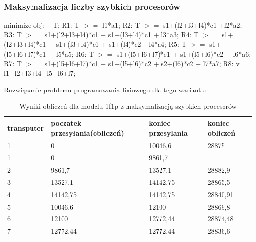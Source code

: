 \documentclass[a4paper,11pt, titlepage]{article}
\begin{document}
\subsubsection{Maksymalizacja liczby szybkich procesorów}
\begin{flushleft}
minimize obj: +T;\linebreak
\linebreak
R1: T $>=$ l1*a1;\linebreak
R2: T $>=$ s1+(l2+l3+l4)*c1 +l2*a2;\linebreak
R3: T $>=$ s1+(l2+l3+l4)*c1 + s1+(l3+l4)*c1 + l3*a3;\linebreak
R4: T $>=$ s1+(l2+l3+l4)*c1 + s1+(l3+l4)*c1 + s1+(l4)*c2 +l4*a4;\linebreak
R5: T $>=$ s1+(l5+l6+l7)*c1 + l5*a5;\linebreak
R6: T $>=$ s1+(l5+l6+l7)*c1 + s1+(l5+l6)*c2 + l6*a6;\linebreak
R7: T $>=$ s1+(l5+l6+l7)*c1 + s1+(l5+l6)*c2 +  s2+(l6)*c2 + l7*a7;\linebreak
R8: v = l1+l2+l3+l4+l5+l6+l7;\linebreak
\end{flushleft}

Rozwiązanie problemu programowania liniowego dla tego wariantu:
\begin{table}[hp!]
\begin{tabular}{|l|l|l|l|}\hline
transputer & poczatek przesyłania(obliczeń) & koniec przesylania & koniec obliczeń\\ \hline
1	&0			&10046,6	&28875\\ \hline
1	&0			&9861,7		&\\ \hline	
2	&9861,7		&13527,1	&28882,9\\ \hline
3	&13527,1	&14142,75	&28865,5\\ \hline
4	&14142,75	&14142,75	&28840,91\\ \hline
5	&10046,6	&12100		&28869,8\\ \hline
6	&12100		&12772,44	&28874,48\\ \hline
7	&12772,44	&12772,44	&28836,6\\ \hline
\end{tabular}
\caption{Wyniki obliczeń dla modelu 1f1p z maksymalizacją szybkich procesorów \label{1f1p_pt}}
\end{table}
\end{document}
